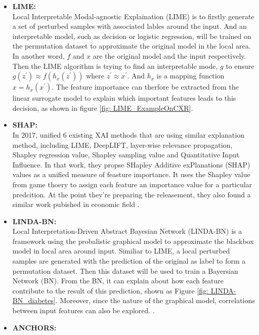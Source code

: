 \begin{itemize}
    \item \textbf{LIME:} \\ Local Interpretable Modal-agnostic Explaination (LIME) is to firstly generate a set of perturbed samples with associated lables around the input. And an interpretable model, such as decision or logistic regression, will be trained on the permutation dataset to approximate the original model in the local area. In another word, $f$ and $x$ are the original model and the input respectively. Then the LIME algorithm is trying to find an interpretable mode, $g$ to ensure $g(z^{'}) \approx f(h_{x}(z^{'}))$ where $z^{'} \approx x^{'}$. And $h_{x}$ is a mapping function $x = h_{x}(x^{'})$. The feature importance can therfore be extracted from the linear surrogate model to explain which important features leads to this decision, as shown in figure \ref{fig: LIME_ExampleOnCXR}.\\
    \item \textbf{SHAP:} \\ In 2017, \citet{Lundberg2017SHAP} unified 6 existing XAI methods that are using similar explanation method, including LIME, DeepLIFT, layer-wise relevance propagation, Shapley regression value, Shapley sampling value and Quantitative Input Influence. In that work, they propse SHapley Additive exPlanations (SHAP) values as a unified measure of feasture importance. It uses the Shapley value from game thoery to assign each feature an importance value for a particular predcition. At the point they're preparing the releasement, they also found a similar work pubished in economic field \citep{Charnes1988ShapeleyValueInEconomic}. \\
    \item \textbf{LINDA-BN:} \\ Local Interpretation-Driven Abstract Bayesian Network (LINDA-BN) is a framework using the probalistic graphical model to approximate the blackbox model in local area around input. Similiar to LIME, a local perturbed samples are generated with the prediction of the original as label to form a permutation dataset. Then this dataset will be used to train a Bayersian Network (BN). From the BN, it can explain about how each feature contribute to the result of this prediction, shown as Figure \ref{fig: LINDA-BN_diabetes}. Moreover, since the nature of the graphical model, correlations between input features can also be explored.  \citep{Moreira2021LINDA}.
    \item \textbf{ANCHORS:} \\ 
\end{itemize}



